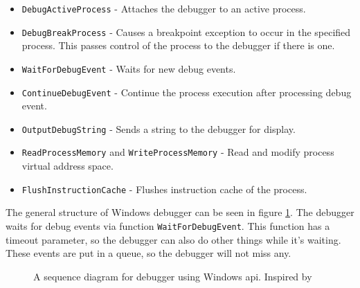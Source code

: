 \begin{itemize}
    \item \texttt{DebugActiveProcess} - Attaches the debugger to an active process.
    \item \texttt{DebugBreakProcess} - Causes a breakpoint exception to occur in the specified process. 
                                          This passes control of the process to the debugger if there is one.
    \item \texttt{WaitForDebugEvent} - Waits for new debug events.
    \item \texttt{ContinueDebugEvent} - Continue the process execution after processing debug event.
    \item \texttt{OutputDebugString} - Sends a string to the debugger for display.
    \item \texttt{ReadProcessMemory} and \texttt{WriteProcessMemory} - Read and modify process virtual address space.
    \item \texttt{FlushInstructionCache} - Flushes instruction cache of the process.
\end{itemize}

The general structure of Windows debugger can be seen in figure \ref{fig:win32debugger}.
The debugger waits for debug events via function \texttt{WaitForDebugEvent}.
This function has a timeout parameter, so the debugger can also do other things while it's waiting.
These events are put in a queue, so the debugger will not miss any.

\begin{figure}
    \centering
    \caption{A sequence diagram for debugger using Windows api. Inspired by }
    \label{fig:win32debugger}
\end{figure}

